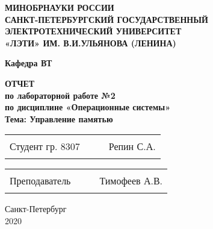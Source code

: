 \begin{titlepage}
\begin{center}
    \uppercase{\textbf{Минобрнауки России\\
            Санкт-Петербургский государственный\\
            электротехнический университет\\
            «ЛЭТИ» им. В.И.Ульянова (Ленина)
    }}
    \vspace{0.25cm}

    \textbf{Кафедра ВТ}
    \vfill

    \uppercase{\textbf{\large{
        Отчет
    }}}
    \\
    \textbf{\large{
      по лабораторной работе №2\\
      по дисциплине «Операционные системы»\\
      Тема: Управление памятью\\
      \vspace{0.5cm}
    }}
  \bigskip
\end{center}
\vfill

\begin{tabularx}{\textwidth}{@{}lcXr}
    Студент гр. 8307 & \hspace{1.6cm} & \rule{5cm}{1pt} & Репин С.А.
\end{tabularx}

\vspace{0.5cm}

\noindent
\begin{tabularx}{\textwidth}{@{}lcXr}
    Преподаватель & \hspace{2cm} & \rule{5cm}{1pt} & Тимофеев А.В.
\end{tabularx}

\hfill \break
\hfill \break

\begin{center}
  Санкт-Петербург\\2020
\end{center}

\end{titlepage}

